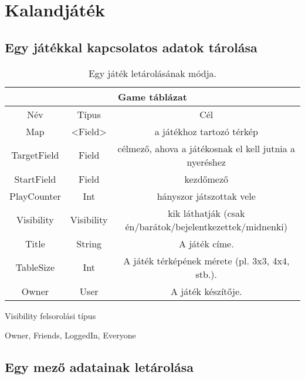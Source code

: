 \section{Kalandjáték}

\subsection{Egy játékkal kapcsolatos adatok tárolása}

\begin{table}[H]
	\centering
	\begin{tabular}{ |c|c|c| }
		\hline
		\multicolumn{3}{|c|}{Game táblázat}\\
		\hline
		Név & Típus & Cél \\
		\hline
		Map  & <Field>  & a játékhoz tartozó térkép  \\
		\hline
		TargetField & Field & célmező, ahova a játékosnak el kell jutnia a nyeréshez\\
		\hline
		StartField & Field & kezdőmező\\
		\hline
		PlayCounter & Int & hányszor játszottak vele\\
		\hline
		Visibility & Visibility & kik láthatják \newline (csak én/barátok/bejelentkezettek/midnenki)\\
		\hline
		Title & String & A játék címe. \\
		\hline
		TableSize & Int & A játék térképének mérete (pl. 3x3, 4x4, stb.).\\
		\hline
		Owner & User & A játék készítője.\\
		\hline
	\end{tabular}
	\caption[Game adatbázistábla felépítése]{Egy játék letárolásának módja.}
	\label{tab:game}
\end{table}

Visibility felsorolási típus
\begin{compactitem}
	\item Owner, Friends, LoggedIn, Everyone
\end{compactitem}

\subsection{Egy mező adatainak letárolása}

